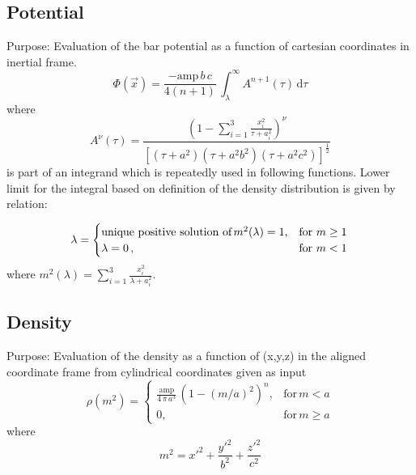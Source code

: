\documentclass[a4paper,11pt]{article}
\begin{document}
		\subsection{Potential} %
			Purpose: Evaluation of the bar potential as a function of cartesian coordinates in inertial frame. \\
   		\begin{equation}
   		\Phi(\vec{x}) = \frac{-\mathrm{amp}\,b\,c}{4(n+1)}\,\int_{\lambda}^{\infty} A^{n+1}(\tau)\,\mathrm{d} \tau
   		\end{equation}
   			where
		\begin{equation}
		A^{\nu}(\tau) = \frac{\left(1- \sum_{i=1}^{3} \frac{x_i^2}{\tau + a_i^2}\right)^{\nu}}{[(\tau + a^2)(\tau + a^2b^2)(\tau + a^2c^2)]^\frac{1}{2}}
		\end{equation}
   			is part of an integrand which is repeatedly used in following functions. Lower limit for the integral based on definition of the density distribution is given by relation:
 
		\begin{equation}
		\lambda = \begin{cases}
		\text{unique positive solution of} \, m^2(\lambda)=1, &  \text{for}\ m \geq 1\\
		\lambda = 0\,, & \text{for}\ m < 1
		\end{cases} \\
		\end{equation}
		where $ m^2(\lambda) = \sum_{i=1}^{3} \frac{x_i^2}{\lambda + a_i^2} $.	
	
		\subsection{Density} %
			Purpose: Evaluation of the density as a function of (x,y,z) in the aligned coordinate frame from cylindrical coordinates given as input\\
		\begin{equation*}
		\rho(m^2) = \begin{cases}
		\frac{\mathrm{amp}}{4\,\pi\,a^3}\,(1-(m/a)^2)^n, & \text{for}\, m < a \\
		0, & \text{for}\, m \geq a
		\end{cases}
		\end{equation*}
			where
		\begin{equation}
		m^2 = x'^2 + \frac{y'^2}{b^2}+\frac{z'^2}{c^2}
		\end{equation}
		
\end{document}
